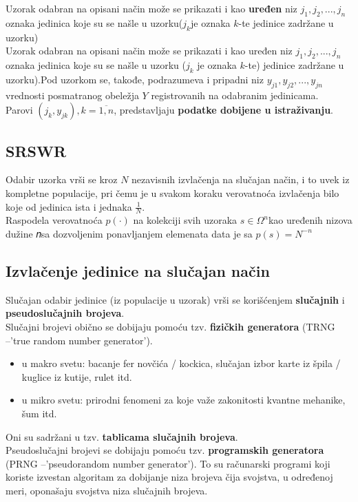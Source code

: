 \documentclass[10pt,a4paper,]{article}
\begin{document}
Uzorak odabran na opisani način može se prikazati i 
kao \textbf{uređen} niz $j_1, j_2,..., j_n$oznaka jedinica koje su se našle u 
uzorku($j_k$je oznaka $k$-te jedinice zadržane u uzorku)
\\

Uzorak odabran na opisani način može se prikazati i kao uređen niz 
$j_1,j_2,...,j_n$ oznaka jedinica koje su se našle u uzorku
($j_k$ je oznaka $k$-te) 
jedinice zadržane u uzorku).Pod uzorkom se, takođe, podrazumeva i 
pripadni niz $y_{j1},y_{j2},...,y_{jn}$vrednosti posmatranog obeležja 
$Y$ registrovanih na odabranim jedinicama.
\\

Parovi $(j_k,y_{jk}), k=\overline{1,𝑛}$, predstavljaju 
\textbf{podatke dobijene u 
istraživanju}.

\subsection{SRSWR}
\textbullet	Odabir uzorka vrši se kroz $N$ nezavisnih izvlačenja na 
slučajan način, i to uvek iz kompletne populacije, pri čemu je u 
svakom koraku verovatnoća izvlačenja bilo koje od jedinica ista i 
jednaka $\frac{1}{N}$.
\\
\textbullet 
Raspodela verovatnoća $p(\cdot)$ na kolekciji svih uzoraka
$s \in \Omega^n$kao 
uređenih 
nizova dužine 𝑛sa dozvoljenim ponavljanjem elemenata data je sa
$p(s) = N^{-n}$

\subsection{Izvlačenje jedinice na slučajan način}
Slučajan odabir jedinice (iz populacije u uzorak) vrši se korišćenjem 
\textbf{slučajnih} i \textbf{pseudoslučajnih brojeva}.
\\
Slučajni brojevi obično se dobijaju pomoću tzv. 
\textbf{fizičkih
generatora}
(TRNG –'true random number generator').
\begin{itemize}
\item u makro svetu: bacanje fer novčića / 
kockica, slučajan izbor karte iz špila / kuglice 
iz kutije, rulet itd.
\item u mikro svetu: prirodni fenomeni za koje važe zakonitosti kvantne mehanike, šum itd.
\end{itemize}
Oni su sadržani u tzv. \textbf{tablicama slučajnih brojeva}.
\\[0.1cm]
Pseudoslučajni brojevi se dobijaju pomoću tzv. \textbf{programskih generatora}
(PRNG –'pseudorandom number generator').
To su računarski programi koji koriste izvestan algoritam za dobijanje niza brojeva čija 
svojstva, u određenoj meri, oponašaju svojstva niza slučajnih brojeva.
\end{document}
